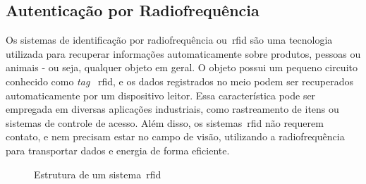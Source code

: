 \subsection{Autenticação por Radiofrequência}
\label{subsec:autenticacao-identificacao-radiofrequencia}

Os sistemas de identificação por radiofrequência ou~\acrfull{rfid} são uma
tecnologia
utilizada para recuperar informações automaticamente sobre produtos, pessoas ou
animais - ou seja, qualquer objeto em geral.
O objeto possui um pequeno circuito conhecido como \textit{tag}~\acrshort{
    rfid}, e os
dados registrados no meio podem ser recuperados automaticamente por um
dispositivo leitor.
Essa característica pode ser empregada em diversas aplicações industriais,
como rastreamento de itens ou sistemas de controle de acesso.
Além disso, os sistemas~\acrshort{rfid} não requerem contato, e nem precisam
estar
no campo de visão, utilizando a radiofrequência para transportar dados e energia
de forma eficiente\cite{feldhofer2004}.

\begin{figure}[h!]
    \caption[Estrutura de um sistema~\acrshort{rfid}]
    {Estrutura de um sistema~\acrshort{rfid}}
    \label{fig:estrutura-sistema-rfid}
\end{figure}

